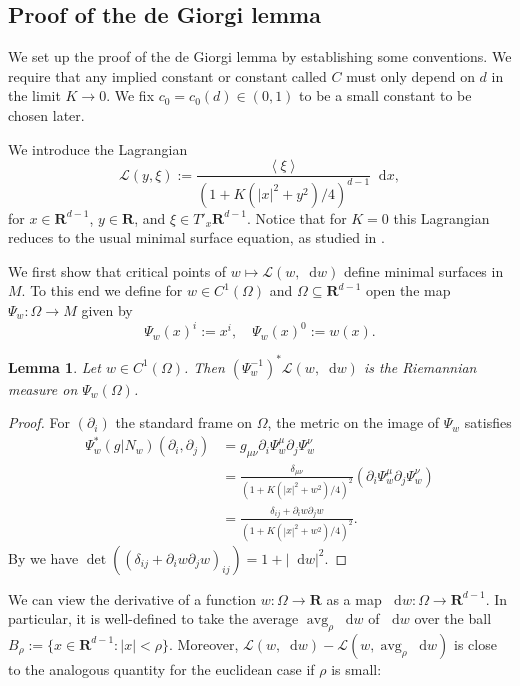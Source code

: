\documentclass[reqno,10pt]{amsart}
\newcommand{\RR}{\mathbf{R}}
\DeclareMathOperator{\avg}{avg}
\newcommand*\dif{\mathop{}\!\mathrm{d}}
\newcommand{\Lagrange}{\mathscr L}
\def\Japan#1{\left \langle #1 \right \rangle}
\newtheorem{lemma}[theorem]{Lemma}
\theoremstyle{definition}
\numberwithin{equation}{section}
\begin{document}
\subsection{Proof of the de Giorgi lemma}
We set up the proof of the de Giorgi lemma by establishing some conventions.
We require that any implied constant or constant called $C$ must only depend on $d$ in the limit $K \to 0$.
We fix $c_0 = c_0(d) \in (0, 1)$ to be a small constant to be chosen later.

We introduce the Lagrangian
$$\Lagrange(y, \xi) := \frac{\Japan{\xi}}{(1 + K(|x|^2 + y^2)/4)^{d - 1}} \dif x,$$
for $x \in \RR^{d - 1}$, $y \in \RR$, and $\xi \in T'_x \RR^{d - 1}$.
Notice that for $K = 0$ this Lagrangian reduces to the usual minimal surface equation, as studied in \cite[\S4]{Miranda66}.

We first show that critical points of $w \mapsto \Lagrange(w, \dif w)$ define minimal surfaces in $M$.
To this end we define for $w \in C^1(\Omega)$ and $\Omega \subseteq \RR^{d - 1}$ open the map $\Psi_w: \Omega \to M$ given by 
$$\Psi_w(x)^i := x^i, \quad \Psi_w(x)^0 := w(x).$$

\begin{lemma}\label{Plateau setup lemma}
Let $w \in C^1(\Omega)$. Then $(\Psi_w^{-1})^* \Lagrange(w, \dif w)$ is the Riemannian measure on $\Psi_w(\Omega)$.
\end{lemma}
\begin{proof}
For $(\partial_i)$ the standard frame on $\Omega$, the metric on the image of $\Psi_w$ satisfies
\begin{align*}
\Psi_w^*(g|N_w)(\partial_i, \partial_j) &= g_{\mu\nu} \partial_i \Psi_w^\mu \partial_j \Psi_w^\nu \\
&= \frac{\delta_{\mu\nu}}{(1 + K(|x|^2 + w^2)/4)^2} (\partial_i \Psi_w^\mu \partial_j \Psi_w^\nu) \\
&= \frac{\delta_{ij} + \partial_i w \partial_j w}{(1 + K(|x|^2 + w^2)/4)^2}.
\end{align*}
By \cite[(24)]{Petersen2008} we have $\det((\delta_{ij} + \partial_i w \partial_j w)_{ij}) = 1 + |\dif w|^2$.
\end{proof}

We can view the derivative of a function $w: \Omega \to \RR$ as a map $\dif w: \Omega \to \RR^{d - 1}$.
In particular, it is well-defined to take the average $\avg_\rho \dif w$ of $\dif w$ over the ball $B_\rho := \{x \in \RR^{d - 1}: |x| < \rho\}$.
Moreover, $\Lagrange(w, \dif w) - \Lagrange(w, \avg_\rho \dif w)$ is close to the analogous quantity for the euclidean case if $\rho$ is small:
\end{document}
